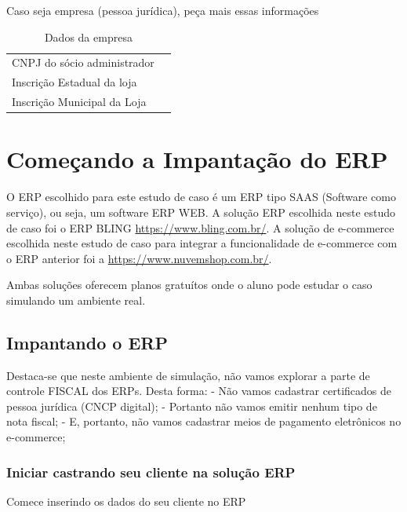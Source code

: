 \documentclass[
]{book}
\begin{document}
Caso seja empresa (pessoa jurídica), peça mais essas informações

\begin{longtable}[]{@{}ll@{}}
\caption{Dados da empresa}\tabularnewline
\toprule\noalign{}
\endfirsthead
\endhead
\bottomrule\noalign{}
\endlastfoot
CNPJ do sócio administrador & \\
Inscrição Estadual da loja & \\
Inscrição Municipal da Loja & \\
\end{longtable}

\section{Começando a Impantação do ERP}\label{comeuxe7ando-a-impantauxe7uxe3o-do-erp}

O ERP escolhido para este estudo de caso é um ERP tipo SAAS (Software como serviço), ou seja, um software ERP WEB. A solução ERP escolhida neste estudo de caso foi o ERP BLING \url{https://www.bling.com.br/}. A solução de e-commerce escolhida neste estudo de caso para integrar a funcionalidade de e-commerce com o ERP anterior foi a \url{https://www.nuvemshop.com.br/}.

Ambas soluções oferecem planos gratuítos onde o aluno pode estudar o caso simulando um ambiente real.

\subsection{Impantando o ERP}\label{impantando-o-erp}

Destaca-se que neste ambiente de simulação, não vamos explorar a parte de controle FISCAL dos ERPs. Desta forma: - Não vamos cadastrar certificados de pessoa jurídica (CNCP digital); - Portanto não vamos emitir nenhum tipo de nota fiscal; - E, portanto, não vamos cadastrar meios de pagamento eletrônicos no e-commerce;

\subsubsection{Iniciar castrando seu cliente na solução ERP}\label{iniciar-castrando-seu-cliente-na-soluuxe7uxe3o-erp}

Comece inserindo os dados do seu cliente no ERP
\end{document}
